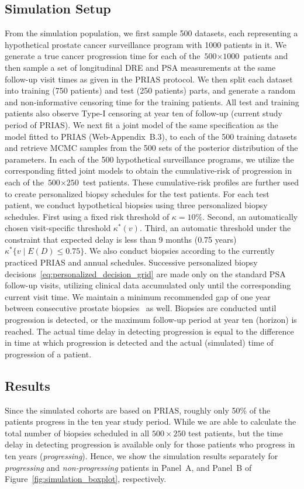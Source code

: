 \subsection{Simulation Setup}
From the simulation population, we first sample 500 datasets, each representing a hypothetical prostate cancer surveillance program with 1000 patients in it. We generate a true cancer progression time for each of the ${\mbox{500} \times \mbox{1000}}$ patients and then sample a set of longitudinal DRE and PSA measurements at the same follow-up visit times as given in the PRIAS protocol. We then split each dataset into training (750 patients) and test (250 patients) parts, and generate a random and non‐informative censoring time for the training patients. All test and training patients also observe Type-I censoring at year ten of follow-up (current study period of PRIAS). We next fit a joint model of the same specification as the model fitted to PRIAS (Web-Appendix~B.3), to each of the 500 training datasets and retrieve MCMC samples from the 500 sets of the posterior distribution of the parameters. In each of the 500 hypothetical surveillance programs, we utilize the corresponding fitted joint models to obtain the cumulative-risk of progression in each of the ${\mbox{500} \times \mbox{250}}$ test patients. These cumulative-risk profiles are further used to create personalized biopsy schedules for the test patients. For each test patient, we conduct hypothetical biopsies using three personalized biopsy schedules. First using a fixed risk threshold of $\kappa=10\%$. Second, an automatically chosen visit-specific threshold $\kappa^*(v)$. Third, an automatic threshold under the constraint that expected delay is less than 9 months (0.75 years) $\kappa^*\{v \mid E(D)\leq 0.75\}$. We also conduct biopsies according to the currently practiced PRIAS and annual schedules. Successive personalized biopsy decisions~\ref{eq:personalized_decision_grid} are made only on the standard PSA follow-up visits, utilizing clinical data accumulated only until the corresponding current visit time. We maintain a minimum recommended gap of one year between consecutive prostate biopsies~\citep{bokhorst2015compliance} as well. Biopsies are conducted until progression is detected, or the maximum follow-up period at year ten (horizon) is reached. The actual time delay in detecting progression is equal to the difference in time at which progression is detected and the actual (simulated) time of progression of a patient.

\subsection{Results}
Since the simulated cohorts are based on PRIAS, roughly only 50\% of the patients progress in the ten year study period. While we are able to calculate the total number of biopsies scheduled in all $500 \times 250$ test patients, but the time delay in detecting progression is available only for those patients who progress in ten years (\textit{progressing}). Hence, we show the simulation results separately for \textit{progressing} and \textit{non-progressing} patients in Panel~A, and Panel~B of Figure~\ref{fig:simulation_boxplot}, respectively.


